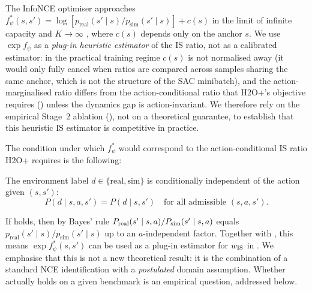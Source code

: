\begin{remark}
\label{lem:nce}
The InfoNCE optimiser approaches $f_\psi^*(s, s') = \log [p_{\text{real}}(s' \mid s) / p_{\text{sim}}(s' \mid s)] + c(s)$ in the limit of infinite capacity and $K \to \infty$ \citep{oord2018representation, ma2018nce}, where $c(s)$ depends only on the anchor $s$.
We use $\exp f_\psi$ as a \emph{plug-in heuristic estimator} of the IS ratio, not as a calibrated estimator: in the practical training regime $c(s)$ is not normalised away (it would only fully cancel when ratios are compared across samples sharing the same anchor, which is not the structure of the SAC minibatch), and the action-marginalised ratio differs from the action-conditional ratio that H2O+'s objective requires () unless the dynamics gap is action-invariant.
We therefore rely on the empirical Stage~2 ablation (), not on a theoretical guarantee, to establish that this heuristic IS estimator is competitive in practice.
\end{remark}

The condition under which $f_\psi^*$ would correspond to the action-conditional IS ratio H2O+ requires is the following:

\begin{assumption}
\label{ass:action_invariance}
The environment label $d \in \{\text{real}, \text{sim}\}$ is conditionally independent of the action given $(s, s')$:
\begin{equation}
P(d \mid s, a, s') = P(d \mid s, s') \quad \text{for all admissible } (s, a, s').
\label{eq:ass1}
\end{equation}
\end{assumption}

\begin{remark}
\label{rem:combined}
If  holds, then by Bayes' rule $P_{\mathrm{real}}(s' \mid s, a) / P_{\mathrm{sim}}(s' \mid s, a)$ equals $p_{\text{real}}(s' \mid s) / p_{\text{sim}}(s' \mid s)$ up to an $a$-independent factor.
Together with , this means $\exp f_\psi^*(s, s')$ can be used as a plug-in estimator for $w_{\mathrm{IS}}$ in .
We emphasise that this is not a new theoretical result: it is the combination of a standard NCE identification with a \emph{postulated} domain assumption.
Whether  actually holds on a given benchmark is an empirical question, addressed below.
\end{remark}

